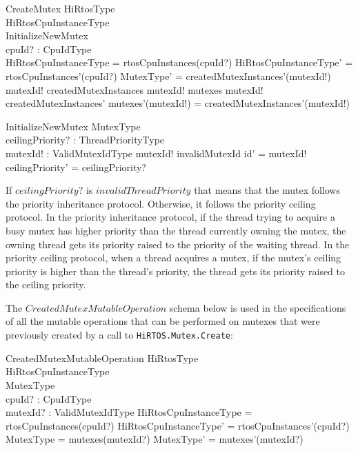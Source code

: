 \documentclass{AUJarticle}
\begin{document}
\begin{schema}{CreateMutex}
   \Delta HiRtosType \\
   \Delta HiRtosCpuInstanceType \\
   InitializeNewMutex \\
   cpuId? : CpuIdType \\
\where
   \theta HiRtosCpuInstanceType = rtosCpuInstances(cpuId?)
\also
   \theta HiRtosCpuInstanceType' = rtosCpuInstances'(cpuId?)
\also
   \theta MutexType' = createdMutexInstances'(mutexId!)
\also
   mutexId! \notin \dom createdMutexInstances
\also
   mutexId! \notin \dom mutexes
\also
   mutexId! \in \dom createdMutexInstances'
\also
   mutexes'(mutexId!) = createdMutexInstances'(mutexId!)
\end{schema}

\begin{schema}{InitializeNewMutex}
   \Delta MutexType \\
   ceilingPriority? : ThreadPriorityType \\
   mutexId! : ValidMutexIdType
\where
   mutexId! \neq invalidMutexId
\also
   id' = mutexId!
\also
   ceilingPriority' = ceilingPriority?
\end{schema}

If $ceilingPriority?$ is $invalidThreadPriority$ that means that the mutex follows the priority
inheritance protocol. Otherwise, it follows the priority ceiling protocol. In the priority inheritance
protocol, if the thread trying to acquire a busy mutex has higher priority than the thread currently
owning the mutex, the owning thread gets its priority raised to the priority of the waiting thread.
In the priority ceiling protocol, when a thread acquires a mutex, if the mutex's ceiling priority is
higher than the thread's priority, the thread gets its priority raised to the ceiling priority.

The $CreatedMutexMutableOperation$ schema below is used in the specifications of all the mutable
operations that can be performed on mutexes that were previously created by a call to
\verb'HiRTOS.Mutex.Create':

\begin{schema}{CreatedMutexMutableOperation}
   \Delta HiRtosType \\
   \Delta HiRtosCpuInstanceType \\
   \Delta MutexType \\
   cpuId? : CpuIdType \\
   mutexId? : ValidMutexIdType
\where
   \theta HiRtosCpuInstanceType = rtosCpuInstances(cpuId?)
\also
   \theta HiRtosCpuInstanceType' = rtosCpuInstances'(cpuId?)
\also
   \theta MutexType = mutexes(mutexId?)
\also
   \theta MutexType' = mutexes'(mutexId?)
\end{schema}
\end{document}
